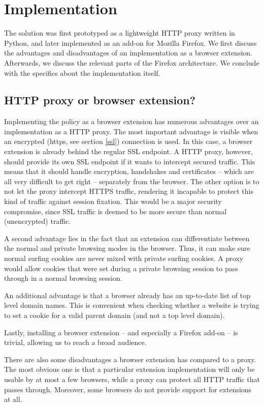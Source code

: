 \section{Implementation}

The solution was first prototyped as a lightweight HTTP proxy written in Python, and later implemented as an add-on for Mozilla Firefox. We first discuss the advantages and disadvantages of an implementation as a browser extension. Afterwards, we discuss the relevant parts of the Firefox architecture. We conclude with the specifics about the implementation itself.

\subsection{HTTP proxy or browser extension?}

Implementing the policy as a browser extension has numerous advantages over an implementation as a HTTP proxy. The most important advantage is visible when an encrypted (\gls{https}, see section \ref{ssl}) connection is used. In this case, a browser extension is already behind the regular SSL endpoint. A HTTP proxy, however, should provide its own SSL endpoint if it wants to intercept secured traffic. This means that it should handle encryption, handshakes and certificates -- which are all very difficult to get right -- separately from the browser. The other option is to not let the proxy intercept HTTPS traffic, rendering it incapable to protect this kind of traffic against session fixation. This would be a major security compromise, since SSL traffic is deemed to be more secure than normal (unencrypted) traffic.

A second advantage lies in the fact that an extension can differentiate between the normal and private browsing modes in the browser. Thus, it can make sure normal surfing cookies are never mixed with private surfing cookies. A proxy would allow cookies that were set during a private browsing session to pass through in a normal browsing session.

An additional advantage is that a browser already has an up-to-date list of top level domain names. This is convenient when checking whether a website is trying to set a cookie for a valid parent domain (and not a top level domain).

Lastly, installing a browser extension -- and especially a Firefox add-on -- is trivial, allowing us to reach a broad audience.

There are also some disadvantages a browser extension has compared to a proxy. The most obvious one is that a particular extension implementation will only be usable by at most a few browsers, while a proxy can protect all HTTP traffic that passes through. Moreover, some browsers do not provide support for extensions at all.

